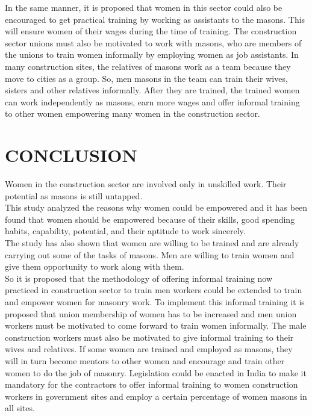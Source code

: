 \documentclass[12pt]{report}
\begin{document}
	In  the  same  manner, it  is  proposed  that  women  in  this  sector  could  also  be  encouraged  to  get  practical  training by  working  as  assistants  to  the  masons.  This  will  ensure  women  of  their  wages  during  the time  of  training. The  construction  sector  unions  must  also  be  motivated  to  work  with  masons,  who are  members  of  the  unions  to  train  women  informally  by  employing  women  as  job assistants.   In  many  construction  sites,  the  relatives  of  masons  work  as  a  team  because  they  move  to cities  as  a  group.  So,  men  masons  in  the  team  can  train  their  wives,  sisters  and  other relatives  informally.  After  they  are  trained,  the  trained  women  can  work  independently  as masons,  earn  more  wages  and  offer  informal  training  to  other  women  empowering  many women  in  the  construction  sector.       
	
	
	\section{CONCLUSION }
	Women  in  the  construction  sector  are  involved  only  in  unskilled  work.  Their potential  as  masons  is  still  untapped. \\
	
	This  study  analyzed  the  reasons  why  women  could be  empowered  and  it  has  been  found  that  women  should  be  empowered  because  of  their skills,  good  spending  habits,  capability,  potential,  and  their  aptitude  to  work  sincerely. \\
	
	The  study  has  also  shown  that  women  are  willing  to  be  trained  and  are  already  carrying out  some  of  the  tasks  of  masons.  Men  are  willing  to  train  women  and  give  them opportunity  to  work  along  with  them.\\
	
	So  it  is  proposed  that  the  methodology  of  offering informal  training  now  practiced  in  construction  sector  to  train  men  workers  could  be extended  to  train  and  empower  women  for  masonry  work.   To  implement  this  informal  training  it  is  proposed  that  union  membership  of women  has  to  be  increased  and  men  union  workers  must  be  motivated  to  come  forward  to train  women  informally.  The  male  construction  workers  must  also  be  motivated  to  give informal  training  to  their  wives  and  relatives.  If  some  women  are  trained  and  employed as  masons,  they  will  in  turn  become  mentors  to  other  women  and  encourage  and  train other  women  to  do  the  job  of  masonry.  Legislation  could  be  enacted  in  India  to  make  it mandatory  for  the  contractors  to  offer  informal  training  to  women  construction  workers in  government  sites  and  employ  a  certain  percentage  of  women  masons  in  all  sites.\\
	
\end{document}
